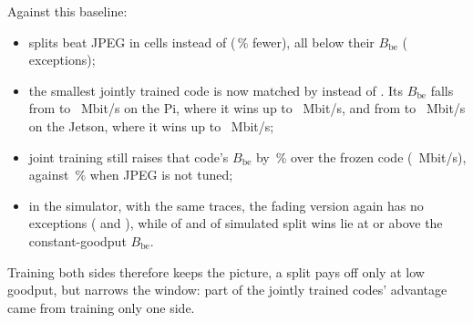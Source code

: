 Against this baseline:
\begin{itemize}
\item splits beat JPEG in \BeTunedCells{} cells instead of \BeCells{} (\BeTunedCellsDropPct\,\% fewer), all below
their $B_{\mathrm{be}}$ (\BeTunedViolations{} exceptions);
\item the smallest jointly trained code is now matched by \BeTunedJointPiQstar{} instead of \BeJointPiQstar. Its
$B_{\mathrm{be}}$ falls from \BeJointPiBe{} to \BeTunedJointPiBe~Mbit/s on the Pi, where it wins up to
\BeTunedJointPiWin~Mbit/s, and from \BeJointFastBe{} to \BeTunedJointFastBe~Mbit/s on the Jetson, where it wins up to
\BeTunedJointFastWin~Mbit/s;
\item joint training still raises that code's $B_{\mathrm{be}}$ by \BeTunedJointShift\,\% over the frozen code
(\BeTunedFrozenPiBe~Mbit/s), against \BeJointShift\,\% when JPEG is not tuned;
\item in the simulator, with the same traces, the fading version again has no exceptions (\BeSimTModFadingExc{} and
\BeSimTVehFadingExc), while \BeSimTModExc{} of \BeSimTModWins{} and \BeSimTVehExc{} of \BeSimTVehWins{} simulated
split wins lie at or above the constant-goodput $B_{\mathrm{be}}$.
\end{itemize}
Training both sides therefore keeps the picture, a split pays off only at low goodput, but narrows the window: part
of the jointly trained codes' advantage came from training only one side.

